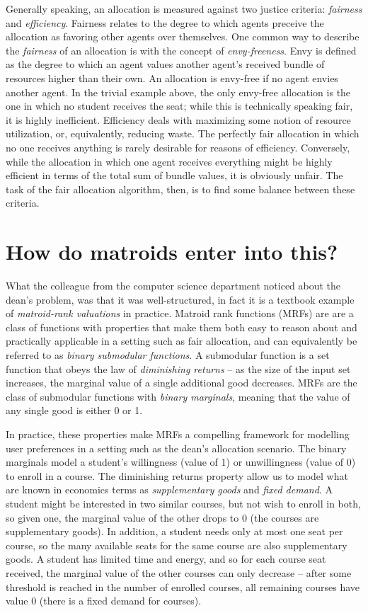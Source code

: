 Generally speaking, an allocation is measured against two justice criteria: \textit{fairness} and \textit{efficiency}. Fairness relates to the degree to which agents preceive the allocation as favoring other agents over themselves. One common way to describe the \textit{fairness} of an allocation is with the concept of \textit{envy-freeness}. Envy is defined as the degree to which an agent values another agent's received bundle of resources higher than their own. An allocation is envy-free if no agent envies another agent. In the trivial example above, the only envy-free allocation is the one in which no student receives the seat; while this is technically speaking fair, it is highly inefficient. Efficiency deals with maximizing some notion of resource utilization, or, equivalently, reducing waste. The perfectly fair allocation in which no one receives anything is rarely desirable for reasons of efficiency. Conversely, while the allocation in which one agent receives everything might be highly efficient in terms of the total sum of bundle values, it is obviously unfair. The task of the fair allocation algorithm, then, is to find some balance between these criteria.

\section*{How do matroids enter into this?}
What the colleague from the computer science department noticed about the dean's problem, was that it was well-structured, in fact it is a textbook example of \textit{matroid-rank valuations} in practice. Matroid rank functions (MRFs) are are a class of functions with properties that make them both easy to reason about and practically applicable in a setting such as fair allocation, and can equivalently be referred to as \textit{binary submodular functions}. A submodular function is a set function that obeys the law of \textit{diminishing returns} -- as the size of the input set increases, the marginal value of a single additional good decreases. MRFs are the class of submodular functions with \textit{binary marginals}, meaning that the value of any single good is either 0 or 1.

In practice, these properties make MRFs a compelling framework for modelling user preferences in a setting such as the dean's allocation scenario. The binary marginals model a student's willingness (value of 1) or unwillingness (value of 0) to enroll in a course. The diminishing returns property allow us to model what are known in economics terms as \textit{supplementary goods} and \textit{fixed demand}. A student might be interested in two similar courses, but not wish to enroll in both, so given one, the marginal value of the other drops to 0 (the courses are supplementary goods). In addition, a student needs only at most one seat per course, so the many available seats for the same course are also supplementary goods. A student has limited time and energy, and so for each course seat received, the marginal value of the other courses can only decrease -- after some threshold is reached in the number of enrolled courses, all remaining courses have value 0 (there is a fixed demand for courses).


